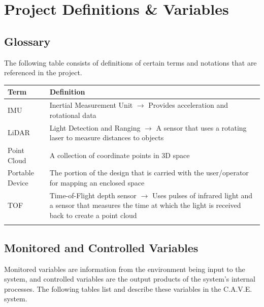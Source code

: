 \documentclass[11pt]{article}
\begin{document}
	\section{Project Definitions \& Variables}
	
	\subsection{Glossary}
		The following table consists of definitions of certain terms and notations that are referenced in the project.
		
		\begin{tabularx}{\textwidth}{X p{}}
			\toprule
			\textbf{Term} & \textbf{Definition} \\
			\midrule
			IMU & Inertial Measurement Unit $\rightarrow$ Provides acceleration and rotational data\\
			\midrule
			LiDAR & Light Detection and Ranging $\rightarrow$ A sensor that uses a rotating laser to measure distances to objects\\
			\midrule
			Point Cloud & A collection of coordinate points in 3D space\\
			\midrule
			Portable Device & The portion of the design that is carried with the user/operator for mapping an enclosed space\\
			\midrule
			TOF & Time-of-Flight depth sensor $\rightarrow$ Uses pulses of infrared light and a sensor that measures the time at which the light is received back to create a point cloud \\
			\bottomrule
			\caption{Definitions}
		\end{tabularx}

	\subsection{Monitored and Controlled Variables}
		Monitored variables are information from the environment being input to the system, and controlled variables are the output products of the system’s internal processes. The following tables list and describe these variables in the C.A.V.E. system. 
	
\end{document}
